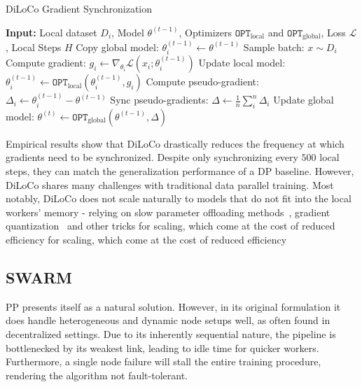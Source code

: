 \documentclass{article}
\begin{document}
\begin{algorithm}
\caption{DiLoCo Gradient Synchronization}
\label{alg:diloco}
\begin{algorithmic}[1]
\STATE \textbf{Input:} Local dataset $D_i$, Model $\theta^{(t-1)}$, Optimizers $\mathtt{OPT}_{\text{local}}$ and $\mathtt{OPT}_{\text{global}}$, Loss $\mathcal{L}$, Local Steps $H$ 
\STATE Copy global model: $\theta_i^{(t-1)} \gets \theta^{(t-1)}$
  \STATE Sample batch: $x \sim D_i$
  \STATE Compute gradient: $g_i \gets \nabla_{\theta_i} \mathcal{L}(x_i; \theta_i^{(t-1)})$
  \STATE Update local model: $\theta_i^{(t-1)} \gets \mathtt{OPT}_{\text{local}}(\theta_i^{(t-1)}, g_i)$
\ENDFOR
\STATE Compute pseudo-gradient: $\Delta_i \gets \theta_i^{(t-1)} - \theta^{(t-1)}$
\STATE Sync pseudo-gradients: $\Delta \gets \frac{1}{n}\sum_i^n \Delta_i$ 
\STATE Update global model: $\theta^{(t)} \gets \mathtt{OPT}_{\text{global}}(\theta^{(t-1)}, \Delta)$
\end{algorithmic}
\end{algorithm}

Empirical results show that DiLoCo drastically reduces the frequency at which
gradients need to be synchronized. Despite only synchronizing every $500$ local
steps, they can match the generalization performance of a DP baseline. However,
DiLoCo shares many challenges with traditional data parallel training. Most
notably, DiLoCo does not scale naturally to models that do not fit into the
local workers' memory - relying on slow parameter offloading
methods~\cite{rhu2016, cui2016}, gradient quantization~\cite{intellect1} and
other tricks for scaling, which come at the cost of reduced efficiency for
scaling, which come at the cost of reduced efficiency

\subsection{SWARM}

PP presents itself as a natural solution. However, in its original formulation 
it does handle heterogeneous and dynamic node setups well, as often found in
decentralized settings. Due to its inherently sequential nature, the pipeline
is bottlenecked by its weakest link, leading to idle time for quicker workers.
Furthermore, a single node failure will stall the entire training procedure,
rendering the algorithm not fault-tolerant.
\end{document}
